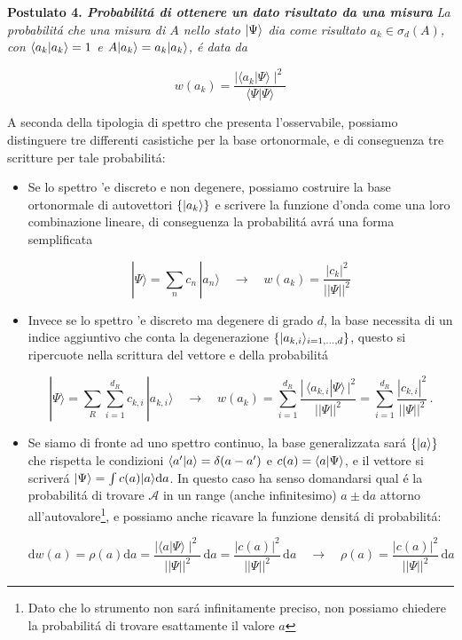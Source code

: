 \textbf{Postulato 4. \textit{Probabilit\'a di ottenere un dato risultato da una misura}} \textit{La probabilit\'a che una misura di $A$ nello stato $\normalsize| \Psi \normalsize\rangle$ dia come risultato $a_k \in \sigma_d(A)$, con $\normalsize\langle a_k \normalsize| a_k \normalsize\rangle = 1$ e $A \normalsize| a_k \normalsize\rangle = a_k \normalsize| a_k \normalsize\rangle$, \'e data da}

$$w(a_{k})={\frac{\mid\langle a_{k}|\Psi\rangle\mid^{2}}{\langle\Psi|\Psi\rangle}}$$

A seconda della tipologia di spettro che presenta l'osservabile, possiamo distinguere tre differenti casistiche per la base ortonormale, e di conseguenza tre scritture per tale probabilit\'a:
\begin{itemize}
	\item Se lo spettro 'e discreto e non degenere, possiamo costruire la base ortonormale di autovettori $\{\normalsize| a_k \normalsize\rangle\}$ e scrivere la funzione d'onda come una loro combinazione lineare, di conseguenza la probabilit\'a avr\'a una forma semplificata

	$$|\Psi\rangle=\sum_{n}c_{n}\,|a_{n}\rangle\quad\longrightarrow\quad w(a_{k})={\frac{|c_{k}|^{2}}{||\Psi||^{2}}}$$

	\item Invece se lo spettro 'e discreto ma degenere di grado $d$, la base necessita di un indice aggiuntivo che conta la degenerazione $\{ \normalsize| a_{k,i} \normalsize\rangle_{i=1,...,d}\}$, questo si ripercuote nella scrittura del vettore e della probabilit\'a

	$$|\Psi\rangle=\sum_{R}\sum_{i=1}^{d_{R}}c_{k,i}\,|a_{k,i}\rangle\quad\longrightarrow\quad w(a_{k})=\sum_{i=1}^{d_{R}}\frac{|\,\langle a_{k,i}|\Psi\rangle\,|^{2}}{||\Psi||^{2}}=\sum_{i=1}^{d_{R}}\frac{|c_{k,i}|^{2}}{||\Psi||^{2}}\,.$$

	\item Se siamo di fronte ad uno spettro continuo, la base generalizzata sar\'a $\{\normalsize| a \normalsize\rangle\}$ che rispetta le condizioni $\normalsize\langle a^\prime \normalsize| a \normalsize\rangle = \delta(a-a^\prime)$ e $c(a) = \normalsize\langle a \normalsize| \Psi \normalsize\rangle$, e il vettore si scriver\'a $\normalsize| \Psi \normalsize\rangle = \int c(a)\normalsize| a \normalsize\rangle \mathrm{d}a$. In questo caso ha senso domandarsi qual \'e la probabilit\'a di trovare $\mathcal{A}$ in un range (anche infinitesimo) $a \pm \mathrm{d}a$ attorno all'autovalore\footnote{Dato che lo strumento non sar\'a infinitamente preciso, non possiamo chiedere la probabilit\'a di trovare esattamente il valore $a$}, e possiamo anche ricavare la funzione densit\'a di probabilit\'a:

	$$\mathrm{d} w(a)=\rho(a)\mathrm{d} a={\frac{\mid\langle a|\Psi\rangle\mid^{2}}{||\Psi||^{2}}}\,\mathrm{d}a={\frac{|c(a)|^{2}}{||\Psi||^{2}}}\,\mathrm{d}a\quad\longrightarrow\quad\rho(a)={\frac{|c(a)|^{2}}{||\Psi||^{2}}}\,\mathrm{d}a$$
\end{itemize}

